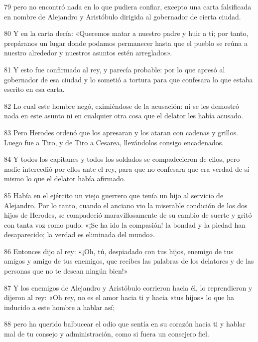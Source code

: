 \par 79 pero no encontró nada en lo que pudiera confiar, excepto una carta falsificada en nombre de Alejandro y Aristóbulo dirigida al gobernador de cierta ciudad.

\par 80 Y en la carta decía: «Queremos matar a nuestro padre y huir a ti; por tanto, prepáranos un lugar donde podamos permanecer hasta que el pueblo se reúna a nuestro alrededor y nuestros asuntos estén arreglados».

\par 81 Y esto fue confirmado al rey, y parecía probable: por lo que apresó al gobernador de esa ciudad y lo sometió a tortura para que confesara lo que estaba escrito en esa carta.

\par 82 Lo cual este hombre negó, eximiéndose de la acusación: ni se les demostró nada en este asunto ni en cualquier otra cosa que el delator les había acusado.

\par 83 Pero Herodes ordenó que los apresaran y los ataran con cadenas y grillos. Luego fue a Tiro, y de Tiro a Cesarea, llevándolos consigo encadenados.

\par 84 Y todos los capitanes y todos los soldados se compadecieron de ellos, pero nadie intercedió por ellos ante el rey, para que no confesara que era verdad de sí mismo lo que el delator había afirmado.

\par 85 Había en el ejército un viejo guerrero que tenía un hijo al servicio de Alejandro. Por lo tanto, cuando el anciano vio la miserable condición de los dos hijos de Herodes, se compadeció maravillosamente de su cambio de suerte y gritó con tanta voz como pudo: «¡Se ha ido la compasión! la bondad y la piedad han desaparecido; la verdad es eliminada del mundo».

\par 86 Entonces dijo al rey: «¡Oh, tú, despiadado con tus hijos, enemigo de tus amigos y amigo de tus enemigos, que recibes las palabras de los delatores y de las personas que no te desean ningún bien!»

\par 87 Y los enemigos de Alejandro y Aristóbulo corrieron hacia él, lo reprendieron y dijeron al rey: «Oh rey, no es el amor hacia ti y hacia «tus hijos» lo que ha inducido a este hombre a hablar así;

\par 88 pero ha querido balbucear el odio que sentía en su corazón hacia ti y hablar mal de tu consejo y administración, como si fuera un consejero fiel.

